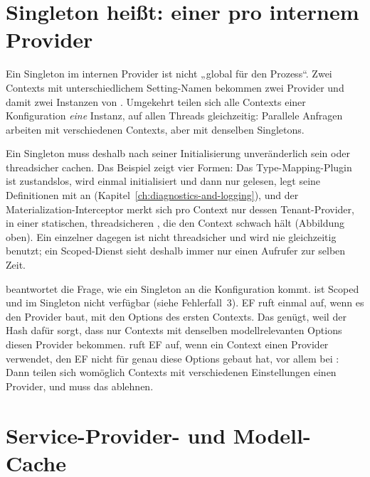 \section{Singleton heißt: einer pro internem Provider}

Ein Singleton im internen Provider ist nicht „global für den Prozess“. Zwei Contexts mit
unterschiedlichem Setting-Namen bekommen zwei Provider und damit zwei Instanzen von
. Umgekehrt teilen sich alle
Contexts einer Konfiguration \emph{eine} Instanz, auf allen Threads gleichzeitig: Parallele
Anfragen arbeiten mit verschiedenen Contexts, aber mit denselben Singletons.

Ein Singleton muss deshalb nach seiner Initialisierung unveränderlich sein oder threadsicher
cachen. Das Beispiel zeigt vier Formen: Das Type-Mapping-Plugin ist zustandslos,
 wird einmal initialisiert und dann
nur gelesen,  legt seine
Definitionen mit 
an (Kapitel~\ref{ch:diagnostics-and-logging}), und der Materialization-Interceptor merkt sich
pro Context nur dessen Tenant-Provider, in einer statischen, threadsicheren
, die den Context schwach hält
(Abbildung oben). Ein einzelner 
dagegen ist nicht threadsicher und wird nie gleichzeitig benutzt; ein Scoped-Dienst sieht
deshalb immer nur einen Aufrufer zur selben Zeit.

 beantwortet die Frage, wie ein Singleton an die
Konfiguration kommt.  ist Scoped und im
Singleton nicht verfügbar (siehe Fehlerfall~3). EF ruft  einmal auf, wenn
es den Provider baut, mit den Options des ersten Contexts. Das genügt, weil der Hash dafür
sorgt, dass nur Contexts mit denselben modellrelevanten Options diesen Provider bekommen.
 ruft EF auf, wenn ein Context einen Provider verwendet, den EF nicht für
genau diese Options gebaut hat, vor allem bei
: Dann teilen sich
womöglich Contexts mit verschiedenen Einstellungen einen Provider, und  muss
das ablehnen.

\section{Service-Provider- und Modell-Cache}

